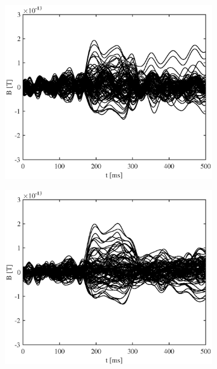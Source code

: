 \documentclass[doc,a4paper,12pt]{apa6}
\begin{document}
\begin{figure}
\begin{subfigure}[c]{0.36\textwidth}
    \label{img:butterfly:mag:sss:pa07}
  \end{subfigure}\vspace*{0.02\textwidth}
  \begin{subfigure}[c]{0.36\textwidth}
    \includegraphics[width=\textwidth]{ergebnisse/pa10/pa10a1_eve2_raw_mag_butterfly.eps}
    \label{img:butterfly:mag:raw:pa10}
  \end{subfigure}\hspace*{0.08\textwidth}
  \begin{subfigure}[c]{0.36\textwidth}
    \includegraphics[width=\textwidth]{ergebnisse/pa10/pa10a1_eve2_sss_mag_butterfly.eps}

\end{subfigure}
\end{figure}
\end{document}
